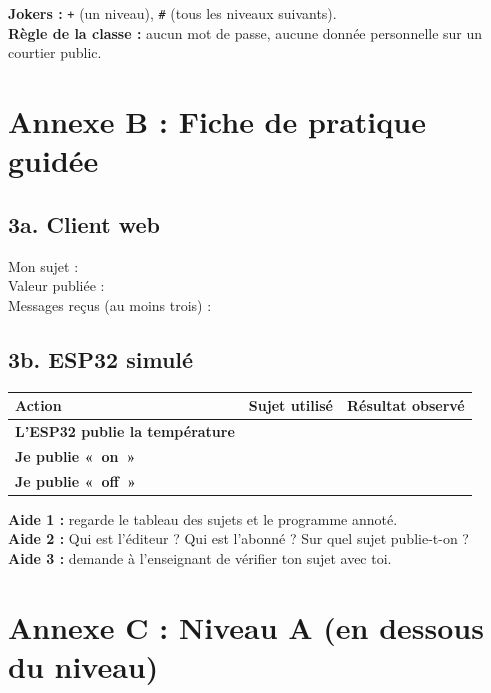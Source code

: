 \documentclass[11pt,a4paper]{article}
\begin{document}
\medskip
\textbf{Jokers :} \texttt{+} (un niveau), \texttt{\#} (tous les niveaux suivants).\\
\textbf{Règle de la classe :} aucun mot de passe, aucune donnée personnelle sur un courtier public.

\newpage
\section*{Annexe B : Fiche de pratique guidée}

\subsection*{3a. Client web}
Mon sujet : \dotfill\\
Valeur publiée : \dotfill\\
Messages reçus (au moins trois) : \dotfill

\subsection*{3b. ESP32 simulé}
\begin{tabularx}{\linewidth}{>{\bfseries}p{3.6cm}Y Y}
\toprule
Action & Sujet utilisé & Résultat observé\\
\midrule
L'ESP32 publie la température & & \\
Je publie «~on~» & & \\
Je publie «~off~» & & \\
\bottomrule
\end{tabularx}

\begin{tcolorbox}[colback=yellow!10,colframe=yellow!50!black,title={Cartes d'aide à utiliser dans l'ordre},fonttitle=\bfseries\small]
\textbf{Aide 1 :} regarde le tableau des sujets et le programme annoté.\\
\textbf{Aide 2 :} Qui est l'éditeur ? Qui est l'abonné ? Sur quel sujet publie-t-on ?\\
\textbf{Aide 3 :} demande à l'enseignant de vérifier ton sujet avec toi.
\end{tcolorbox}

\newpage
\section*{Annexe C : Niveau A (en dessous du niveau)}
\end{document}

